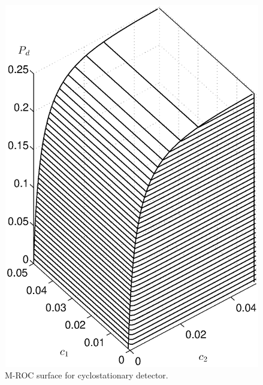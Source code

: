 \begin{figure}[!t]
  \centering 
  \includegraphics[width=12cm, height=16cm]{4/ROCsurface.eps}
  \caption{M-ROC surface for cyclostationary detector.}
  \label{pic:1221n0}
\end{figure}
